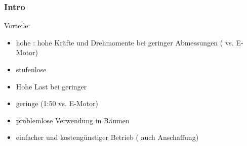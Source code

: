 \begin{frame}
  \frametitle{Intro}
  
  Vorteile:
  \begin{itemize}
    \item hohe : hohe Kräfte und Drehmomente bei 
      geringer Abmessungen ( vs. E-Motor)
    \item stufenlose 
    \item Hohe Last bei geringer 
    \item geringe  (1:50 vs. E-Motor)
    \item problemlose Verwendung in  Räumen
    \item einfacher und kostengünstiger Betrieb ( auch Anschaffung)
  \end{itemize}

\ifteacher%
\else%
  \vspace*{-0.0\baselineskip}\rotatebox[origin=lB]{180}{%
  \resizebox{0.9\linewidth}{!}{\parbox[t]{3.95\linewidth}{%
  Leistungsdichte, 1:10, Geschwindigkeitsregelung, Geschwindigkeit, Trägheitsmassen,  
  explosionsgefährdeten, Pneumatik
  }}}
\fi%
  

\end{frame}


